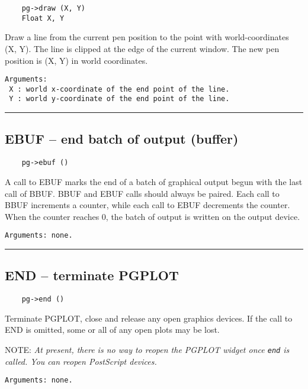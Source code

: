 \begin{verbatim}
    pg->draw (X, Y)
    Float X, Y
\end{verbatim}

Draw a line from the current pen position to the point with
world-coordinates (X, Y).  The line is clipped at the edge of the
current window.  The new pen position is (X, Y) in world coordinates.

\begin{verbatim}
Arguments:
 X : world x-coordinate of the end point of the line.
 Y : world y-coordinate of the end point of the line.
\end{verbatim}

\hrule

\subsection*{EBUF -- end batch of output (buffer) }

\begin{verbatim}
    pg->ebuf ()
\end{verbatim}

A call to EBUF marks the end of a batch of graphical output begun with
the last call of BBUF.  BBUF and EBUF calls should always be paired.
Each call to BBUF increments a counter, while each call to EBUF
decrements the counter.  When the counter reaches 0, the batch of
output is written on the output device.

\begin{verbatim}
Arguments: none.
\end{verbatim}

\hrule

\subsection*{END -- terminate PGPLOT }

\begin{verbatim}
    pg->end ()
\end{verbatim}

Terminate PGPLOT, close and release any open graphics devices.  If the
call to END is omitted, some or all of any open plots may be lost.

NOTE: {\em At present, there is no way to reopen the PGPLOT widget
once {\tt end} is called.  You can reopen PostScript devices.}

\begin{verbatim}
Arguments: none.
\end{verbatim}

